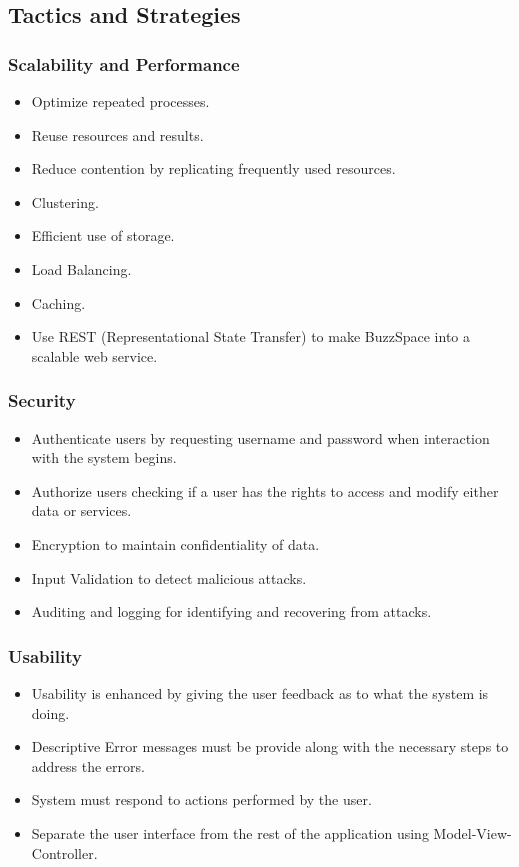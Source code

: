 \subsection{Tactics and Strategies}
\subsubsection{Scalability and Performance}
	\begin{itemize}
		\item Optimize repeated processes.
		\item Reuse resources and results.
		\item Reduce contention by replicating frequently used resources.
		\item Clustering.
		\item Efficient use of storage.
		\item Load Balancing.
		\item Caching.
		\item Use REST (Representational State Transfer) to make BuzzSpace into a scalable web service.
	\end{itemize}	
\subsubsection{Security}
	\begin{itemize}
		\item Authenticate users by requesting username and password when interaction with the system begins.
		\item Authorize users checking if a user has the rights to access and modify either data or services.
		\item Encryption to maintain confidentiality of data.
		\item Input Validation to detect malicious attacks.
		\item Auditing and logging for identifying and recovering from attacks.
	\end{itemize}	
\subsubsection{Usability}
	\begin{itemize}
		\item Usability is enhanced by giving the user feedback as to what the system is doing.
		\item Descriptive Error messages must be provide along with the necessary steps to address the errors.
		\item System must respond to actions performed by the user.
		\item Separate the user interface from the rest of the application using Model-View-Controller.
	\end{itemize}
